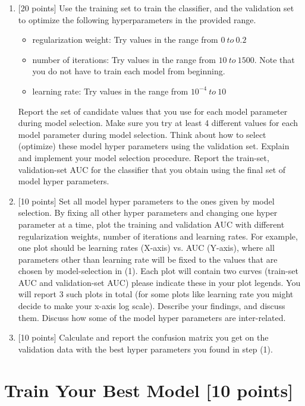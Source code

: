 \documentclass[letterpaper]{article}
\begin{document}
\begin{enumerate}
\item {[20 points]} Use the training set to train the classifier, and the validation set to optimize the following hyperparameters in the provided range.
\begin{itemize}
\item regularization weight: Try values in the range from $0 \ to \ 0.2$
\item number of iterations: Try values in the range from $10 \ to \ 1500$. Note that you do not have to train each model from beginning.
\item learning rate: Try values in the range from $10^{-4} \ to \ 10$
\end{itemize}
Report the set of candidate values that you use for each model parameter during model selection. Make sure you try at least 4 different values for each model parameter during model selection. Think about how to select (optimize) these model hyper parameters using the validation set. Explain and implement your model selection procedure. Report the train-set, validation-set AUC for the classifier that you obtain using the final set of model hyper parameters.


\item {[10 points]} Set all model hyper parameters to the ones given by model selection. By fixing all other hyper parameters and changing one hyper parameter at a time, plot the training and validation AUC with different regularization weights, number of iterations and learning rates. For example, one plot should be learning rates (X-axis) vs. AUC (Y-axis), where all parameters other than learning rate will be fixed to the values that are chosen by model-selection in (1). Each plot will contain two curves (train-set AUC and validation-set AUC) please indicate these in your plot legends. You will report 3 such plots in total (for some plots like learning rate you might decide to make your x-axis log scale). Describe your findings, and discuss them. Discuss how some of the model hyper parameters are inter-related.

\item{[10 points]} Calculate and report the confusion matrix you get on the validation data with the best hyper parameters you found in step (1).
\end{enumerate}

 

\section{Train Your Best Model [10 points]}
\end{document}
